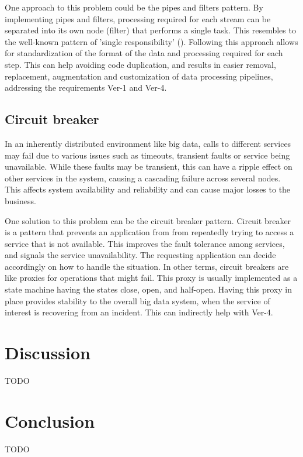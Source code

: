 \documentclass[conference]{IEEEtran}
\begin{document}
One approach to this problem could be the pipes and filters pattern. By implementing pipes and filters, processing required for each stream can be separated into its own node (filter) that performs a single task. This resembles to the well-known pattern of 'single responsibility' (\cite{gamma1995design}). Following this approach allows for standardization of the format of the data and processing required for each step. This can help avoiding code duplication, and results in easier removal, replacement, augmentation and customization of data processing pipelines, addressing the requirements Ver-1 and Ver-4.

\subsection{Circuit breaker}
 
In an inherently distributed environment like big data, calls to different services may fail due to various issues such as timeouts, transient faults or service being unavailable. While these faults may be transient, this can have a ripple effect on other services in the system, causing a cascading failure across several nodes. This affects system availability and reliability and can cause major losses to the business. 

One solution to this problem can be the circuit breaker pattern. Circuit breaker is a pattern that prevents an application from from repeatedly trying to access a service that is not available. This improves the fault tolerance among services, and signals the service unavailability. The requesting application can decide accordingly on how to handle the situation. In other terms, circuit breakers are like proxies for operations that might fail. This proxy is usually implemented as a state machine having the states close, open, and half-open. Having this proxy in place provides stability to the overall big data system, when the service of interest is recovering from an incident. This can indirectly help with Ver-4.


\section{Discussion}
TODO


\section{Conclusion}
TODO



\end{document}

